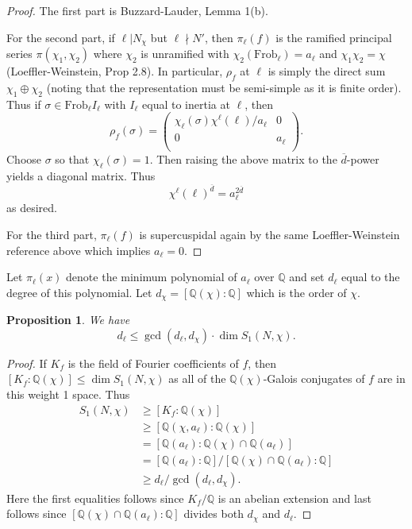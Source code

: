 \documentclass[11pt]{amsart}
\theoremstyle{plain}
\newtheorem{prop}[thm]{Proposition}
\theoremstyle{definition}
\newcommand{\Q}{{\mathbb Q}}
\newcommand{\Frob}{\text{Frob}}
\renewcommand{\[}{\left[}
\renewcommand{\]}{\right]}
\begin{document}
\begin{proof}
The first part is Buzzard-Lauder, Lemma 1(b).

For the second part, if $\ell | N_\chi$ but $\ell \nmid N'$, then $\pi_\ell(f)$ is the ramified principal series $\pi(\chi_1,\chi_2)$ where $\chi_2$ is unramified with $\chi_2(\Frob_\ell) = a_\ell$ and $\chi_1 \chi_2 = \chi$ (Loeffler-Weinstein, Prop 2.8).  In particular, $\rho_f$ at $\ell$ is simply the direct sum $\chi_1 \oplus \chi_2$ (noting that the representation must be semi-simple as it is finite order).  Thus if $\sigma \in \Frob_\ell I_\ell$ with $I_\ell$ equal to inertia at $\ell$, then
$$
\rho_f(\sigma) = 
\begin{pmatrix}
\chi_\ell(\sigma) \chi^\ell(\ell)/a_{\ell} & 0 \\
0 & a_\ell \\
\end{pmatrix}.
$$
Choose $\sigma$ so that $\chi_\ell(\sigma)=1$.  Then raising the above matrix to the $\overline{d}$-power yields a diagonal matrix.  Thus
$$
\chi^\ell(\ell)^{\overline{d}} = a_\ell^{2\overline{d}}
$$
as desired.

For the third part, $\pi_\ell(f)$ is supercuspidal again by the same Loeffler-Weinstein reference above which implies $a_\ell=0$.
\end{proof}

Let $\pi_{\ell}(x)$ denote the minimum polynomial of $a_\ell$ over $\Q$ and set $d_\ell$ equal to the degree of this polynomial.  Let $d_\chi = [\Q(\chi) : \Q]$ which is the order of $\chi$.

\begin{prop}
We have
$$
d_\ell \leq \gcd(d_\ell,d_\chi) \cdot \dim S_1(N,\chi).
$$
\end{prop}

\begin{proof}
If $K_f$ is the field of Fourier coefficients of $f$, then $[K_f:\Q(\chi)] \leq \dim S_1(N,\chi)$ as all of the $\Q(\chi)$-Galois conjugates of $f$ are in this weight 1 space.  Thus
\begin{align*}
S_1(N,\chi) 
&\geq [K_f:\Q(\chi)] \\
&\geq [\Q(\chi,a_\ell):\Q(\chi)] \\
&= [\Q(a_\ell):\Q(\chi) \cap \Q(a_\ell)] \\
&= [\Q(a_\ell):\Q] / [\Q(\chi) \cap \Q(a_\ell):\Q] \\
&\geq d_\ell / \gcd(d_\ell, d_\chi).
\end{align*}
Here the first equalities follows since $K_f/\Q$ is an abelian extension and last follows since $[\Q(\chi) \cap \Q(a_\ell):\Q]$ divides both $d_\chi$ and $d_\ell$.
\end{proof}
\vfill
\pagebreak
\end{document}
